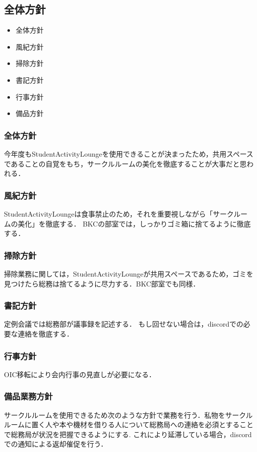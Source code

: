 \subsection*{全体方針}


\begin{itemize}
	\item 全体方針
	\item 風紀方針
	\item 掃除方針
	\item 書記方針
	\item 行事方針
	\item 備品方針
\end{itemize}

\subsubsection*{全体方針}
今年度もStudentActivityLoungeを使用できることが決まったため，共用スペースであることの自覚をもち，サークルルームの美化を徹底することが大事だと思われる．

\subsubsection*{風紀方針}
StudentActivityLoungeは食事禁止のため，それを重要視しながら「サークルームの美化」を徹底する．
BKCの部室では，しっかりゴミ箱に捨てるように徹底する．

\subsubsection*{掃除方針}
掃除業務に関しては，StudentActivityLoungeが共用スペースであるため，ゴミを見つけたら総務は捨てるように尽力する．BKC部室でも同様．

\subsubsection*{書記方針}
定例会議では総務部が議事録を記述する．
もし回せない場合は，discordでの必要な連絡を徹底する．

\subsubsection*{行事方針}
OIC移転により会内行事の見直しが必要になる．

\subsubsection*{備品業務方針}
サークルルームを使用できるため次のような方針で業務を行う．私物をサークルルームに置く人や本や機材を借りる人について総務局への連絡を必須とすることで総務局が状況を把握できるようにする. これにより延滞している場合，discordでの通知による返却催促を行う．
